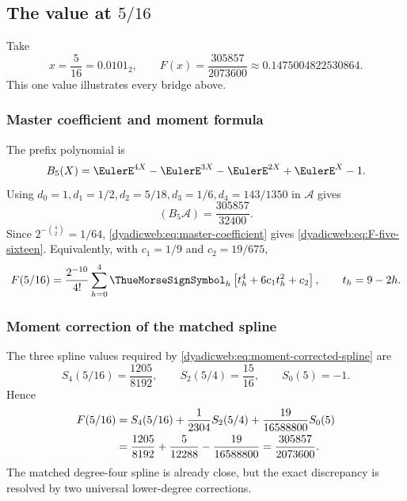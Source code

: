 \documentclass[11pt,oneside]{article}
\theoremstyle{definition}
\theoremstyle{remark}
\begin{document}
\subsection[The value at 5/16]{The value at $5/16$}

Take
\[
 x=\frac5{16}=0.0101_2,
 \qquad
 F(x)=\frac{305857}{2073600}
 \approx0.1475004822530864.                                \label{dyadicweb:eq:F-five-sixteen}
\]
This one value illustrates every bridge above.

\subsubsection{Master coefficient and moment formula}

The prefix polynomial is
\begin{equation}
 B_5(X)=\EulerE^{4X}-\EulerE^{3X}-\EulerE^{2X}+\EulerE^X-1.                  \label{dyadicweb:eq:B5}
\end{equation}
Using
\(
 d_0=1,d_1=1/2,d_2=5/18,d_3=1/6,d_4=143/1350
\)
in $\mathscr A$ gives
\begin{equation}
 [X^4](B_5\mathscr A)=\frac{305857}{32400}.               \label{dyadicweb:eq:B5-coefficient}
\end{equation}
Since $2^{-\binom42}=1/64$, \eqref{dyadicweb:eq:master-coefficient} gives
\eqref{dyadicweb:eq:F-five-sixteen}.  Equivalently, with
$c_1=1/9$ and $c_2=19/675$,
\begin{equation}
 F(5/16)=\frac{2^{-10}}{4!}
 \sum_{h=0}^{4}\ThueMorseSignSymbol_h
 \left[t_h^4+6c_1t_h^2+c_2\right],
 \qquad t_h=9-2h.                                         \label{dyadicweb:eq:five-sixteen-moment}
\end{equation}

\subsubsection{Moment correction of the matched spline}

The three spline values required by \eqref{dyadicweb:eq:moment-corrected-spline} are
\begin{equation}
 S_4(5/16)=\frac{1205}{8192},
 \qquad
 S_2(5/4)=\frac{15}{16},
 \qquad
 S_0(5)=-1.                                                \label{dyadicweb:eq:five-sixteen-splines}
\end{equation}
Hence
\begin{align}
 F(5/16)
 &=S_4(5/16)+\frac1{2304}S_2(5/4)
   +\frac{19}{16588800}S_0(5)                             \notag\\
 &=\frac{1205}{8192}+\frac5{12288}-\frac{19}{16588800}
 =\frac{305857}{2073600}.                                 \label{dyadicweb:eq:five-sixteen-correction}
\end{align}
The matched degree-four spline is already close, but the exact discrepancy is resolved by two
universal lower-degree corrections.
\end{document}
